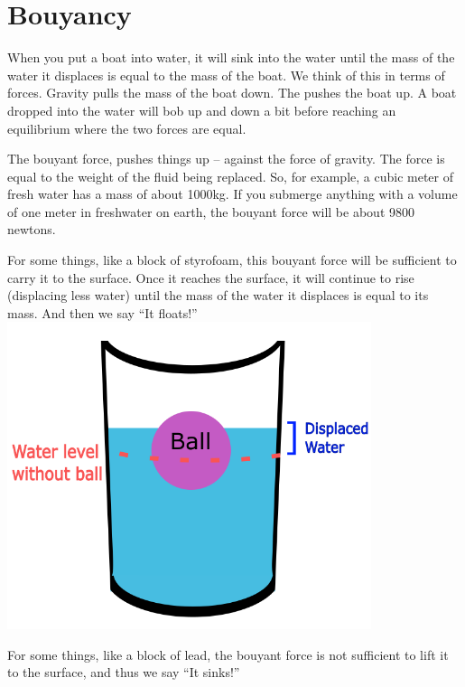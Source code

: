 \chapter{Bouyancy}

When you put a boat into water, it will sink into the water until
the mass of the water it displaces is equal to the mass of the
boat. We think of this in terms of forces. Gravity pulls the mass of
the boat down. The  pushes the boat up. A boat
dropped into the water will bob up and down a bit before reaching an
equilibrium where the two forces are equal.

The bouyant force, pushes things up -- against the force of
gravity. The force is equal to the weight of the fluid being
replaced. So, for example, a cubic meter of fresh water has a mass of
about 1000kg.  If you submerge anything with a volume of one meter in
freshwater on earth, the bouyant force will be about 9800 newtons.

For some things, like a block of styrofoam, this bouyant force will be
sufficient to carry it to the surface. Once it reaches the surface, it
will continue to rise (displacing less water) until the mass of the
water it displaces is equal to its mass. And then we say ``It floats!''
\includegraphics[width=0.8\textwidth]{Buoyancy_Displacement_Diagram.png}

For some things, like a block of lead, the bouyant force is not
 sufficient to lift it to the surface, and thus we say ``It sinks!''

